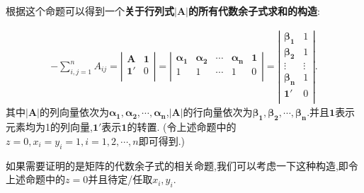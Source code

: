 \documentclass[../../main.tex]{subfiles}%
\begin{document}
\begin{note}\label{关于行列式|A|所有代数余子式求和的构造}
根据这个命题可以得到一个\textbf{关于行列式$|\boldsymbol{A}|$的所有代数余子式求和的构造}:

\begin{align*}
-\sum_{i,j=1}^n{A_{ij}}=\left| \begin{matrix}
\boldsymbol{A}&		\mathbf{1}\\
\mathbf{1}'&		0\\
\end{matrix} \right|=\left| \begin{matrix}
\boldsymbol{\alpha }_{\mathbf{1}}&		\boldsymbol{\alpha }_{\mathbf{2}}&		\cdots&		\boldsymbol{\alpha }_{\boldsymbol{n}}&		\mathbf{1}\\
1&		1&		\cdots&		1&		0\\
\end{matrix} \right|=\left| \begin{matrix}
\boldsymbol{\beta }_{\mathbf{1}}&		1\\
\boldsymbol{\beta }_{\mathbf{2}}&		1\\
\vdots&		\vdots\\
\boldsymbol{\beta }_{\boldsymbol{n}}&		1\\
\mathbf{1}'&		0\\
\end{matrix} \right|.
\end{align*}
其中$|\boldsymbol{A}|$的列向量依次为$\boldsymbol{\alpha }_{\mathbf{1}},\boldsymbol{\alpha }_{\mathbf{2}},\cdots ,\boldsymbol{\alpha }_{\boldsymbol{n}}$,$|\boldsymbol{A}|$的行向量依次为$\boldsymbol{\beta }_{\mathbf{1}},\boldsymbol{\beta }_{\mathbf{2}},\cdots ,\boldsymbol{\beta }_{\boldsymbol{n}}$.并且$\mathbf{1}$表示元素均为1的列向量,$\mathbf{1}'$表示$\mathbf{1}$的转置.
(令上述命题中的$z=0,x_i=y_i=1,i=1,2,\cdots,n$即可得到.)
\end{note}
\begin{remark}
如果需要证明的是矩阵的代数余子式的相关命题,我们可以考虑一下这种构造,即令上述命题中的$z=0$并且待定/任取$x_i,y_i$.
\end{remark}
\end{document}
